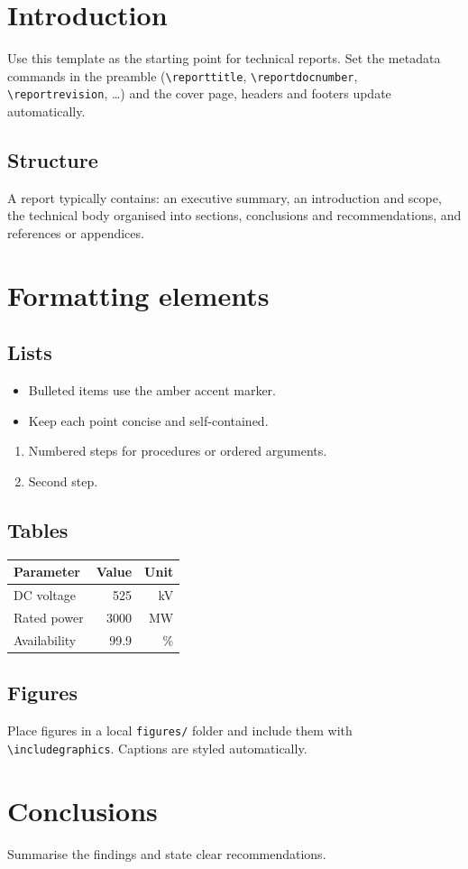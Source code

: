 \documentclass[11pt,a4paper]{article}
\begin{document}
\makecover


\tableofcontents
\clearpage

\section{Introduction}
Use this template as the starting point for technical reports. Set the metadata
commands in the preamble (\texttt{\textbackslash reporttitle}, \texttt{\textbackslash reportdocnumber},
\texttt{\textbackslash reportrevision}, \dots) and the cover page, headers and footers update automatically.

\subsection{Structure}
A report typically contains: an executive summary, an introduction and scope, the
technical body organised into sections, conclusions and recommendations, and
references or appendices.

\section{Formatting elements}

\subsection{Lists}
\begin{itemize}
  \item Bulleted items use the amber accent marker.
  \item Keep each point concise and self-contained.
\end{itemize}

\begin{enumerate}
  \item Numbered steps for procedures or ordered arguments.
  \item Second step.
\end{enumerate}

\subsection{Tables}
\begin{center}
\renewcommand{\arraystretch}{1.3}
\begin{tabular}{@{}l r r@{}}
  \toprule
  \textbf{Parameter} & \textbf{Value} & \textbf{Unit} \\
  \midrule
  DC voltage      & 525  & kV \\
  Rated power     & 3000 & MW \\
  Availability    & 99.9 & \% \\
  \bottomrule
\end{tabular}
\end{center}

\subsection{Figures}
Place figures in a local \texttt{figures/} folder and include them with
\texttt{\textbackslash includegraphics}. Captions are styled automatically.

\section{Conclusions}
Summarise the findings and state clear recommendations.
\end{document}
